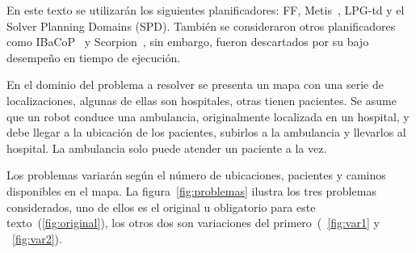 \documentclass[a4paper,12pt]{article}
\begin{document}
En este texto se utilizarán los siguientes planificadores: FF, Metis~\citep{sievers2018metis}, LPG-td y el Solver Planning Domains (SPD). También se consideraron otros planificadores como IBaCoP~\citep{cenamor2018ibacop} y Scorpion~\citep{seipp2018scorpion}, sin embargo, fueron descartados por su bajo desempeño en tiempo de ejecución.

En el dominio del problema a resolver se presenta un mapa con una serie de localizaciones, algunas de ellas son hospitales, otras tienen pacientes. Se asume que un robot conduce una ambulancia, originalmente localizada en un hospital, y debe llegar a la ubicación de los pacientes, subirlos a la ambulancia y llevarlos al hospital. La ambulancia solo puede atender un paciente a la vez.

Los problemas variarán según el número de ubicaciones, pacientes y caminos disponibles en el mapa. La figura~\ref{fig:problemas} ilustra los tres problemas considerados, uno de ellos es el original u obligatorio para este texto~(\ref{fig:original}), los otros dos son variaciones del primero~(~\ref{fig:var1} y ~\ref{fig:var2}).
\end{document}
